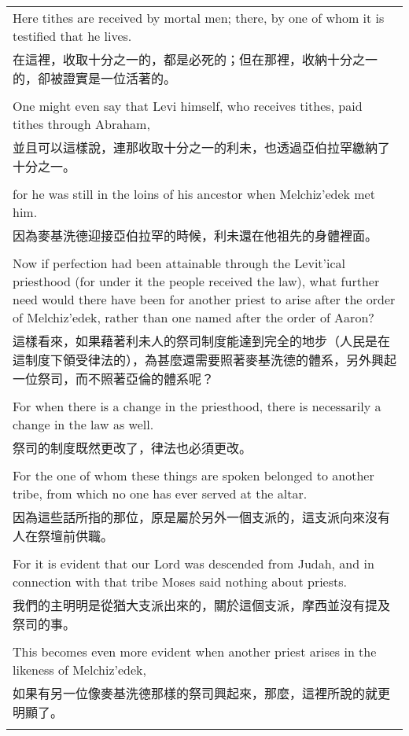 \documentclass{book}
\begin{document}
\begin{tabularx}{\textwidth}{p{}}
Here tithes are received by mortal men; there, by one of whom it is testified that he lives. \\
在這裡，收取十分之一的，都是必死的；但在那裡，收納十分之一的，卻被證實是一位活著的。 \\ \\
One might even say that Levi himself, who receives tithes, paid tithes through Abraham, \\
並且可以這樣說，連那收取十分之一的利未，也透過亞伯拉罕繳納了十分之一。 \\ \\
for he was still in the loins of his ancestor when Melchiz'edek met him. \\
因為麥基洗德迎接亞伯拉罕的時候，利未還在他祖先的身體裡面。 \\ \\
Now if perfection had been attainable through the Levit'ical priesthood (for under it the people received the law), what further need would there have been for another priest to arise after the order of Melchiz'edek, rather than one named after the order of Aaron? \\
這樣看來，如果藉著利未人的祭司制度能達到完全的地步（人民是在這制度下領受律法的），為甚麼還需要照著麥基洗德的體系，另外興起一位祭司，而不照著亞倫的體系呢？ \\ \\
For when there is a change in the priesthood, there is necessarily a change in the law as well. \\
祭司的制度既然更改了，律法也必須更改。 \\ \\
For the one of whom these things are spoken belonged to another tribe, from which no one has ever served at the altar. \\
因為這些話所指的那位，原是屬於另外一個支派的，這支派向來沒有人在祭壇前供職。 \\ \\
For it is evident that our Lord was descended from Judah, and in connection with that tribe Moses said nothing about priests. \\
我們的主明明是從猶大支派出來的，關於這個支派，摩西並沒有提及祭司的事。 \\ \\
This becomes even more evident when another priest arises in the likeness of Melchiz'edek, \\
如果有另一位像麥基洗德那樣的祭司興起來，那麼，這裡所說的就更明顯了。 \\ \\

\end{tabularx}
\end{document}
